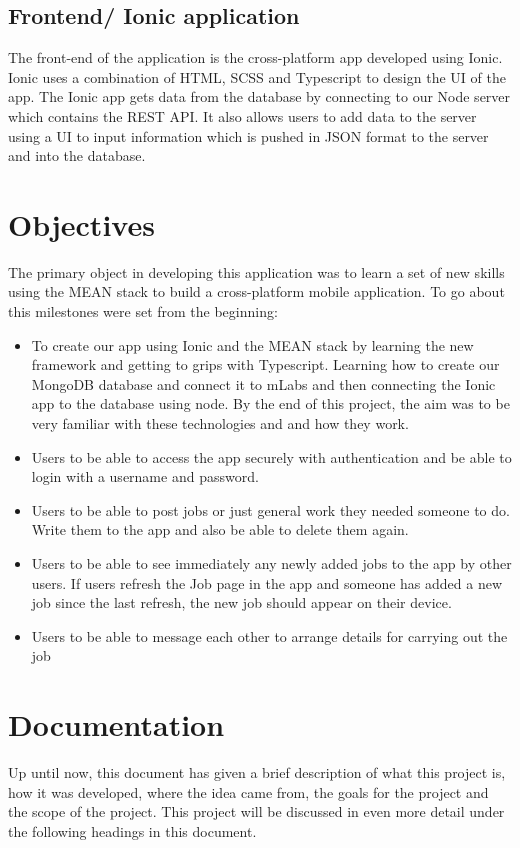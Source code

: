 \subsection{Frontend/ Ionic application}
The front-end of the application is the cross-platform app developed using Ionic. Ionic uses a combination of HTML, SCSS and Typescript to design the UI of the app. The Ionic app gets data from the database by connecting to our Node server which contains the REST API. It also allows users to add data to the server using a UI to input information which is pushed in JSON format to the server and into the database.

\section{Objectives}

The primary object in developing this application was to learn a set of new skills using the MEAN stack to build a cross-platform mobile application. To go about this milestones were set from the beginning:
\begin{itemize}
\item To create our app using Ionic and the MEAN stack by learning the new framework and getting to grips with Typescript. Learning how to create our MongoDB database and connect it to mLabs and then connecting the Ionic app to the database using node. By the end of this project, the aim was to be very familiar with these technologies and and how they work.
\item Users to be able to access the app securely with authentication and be able to login with a username and password.
\item Users to be able to post jobs or just general work they needed someone to do. Write them to the app and also be able to delete them again.
\item Users to be able to see immediately any newly added jobs to the app by other users. If users refresh the Job page in the app and someone has added a new job since the last refresh, the new job should appear on their device. 
\item Users to be able to message each other to arrange details for carrying out the job
\end{itemize}


\section{Documentation}
Up until now, this document has given a brief description of what this project is, how it was developed, where the idea came from, the goals for the project and the scope of the project. This project will be discussed in even more detail under the following headings in this document. 

